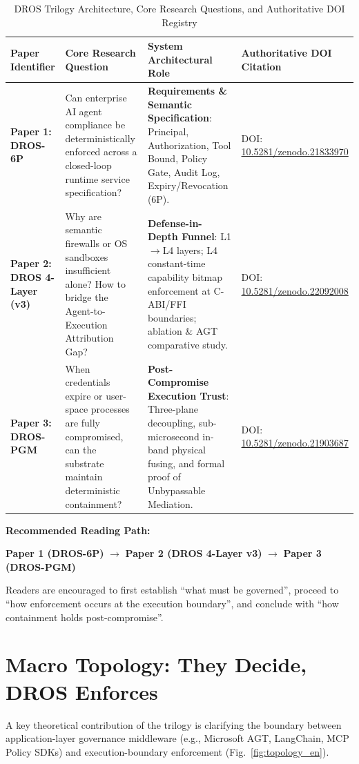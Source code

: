 \documentclass[conference]{IEEEtran}
\begin{document}
\begin{table}[t]
\caption{DROS Trilogy Architecture, Core Research Questions, and Authoritative DOI Registry}
\label{tab:trilogy_overview_en}
\centering
\footnotesize
\renewcommand{\arraystretch}{1.3}
\begin{tabularx}{\textwidth}{l Y Y Y}
\toprule
\textbf{Paper Identifier} & \textbf{Core Research Question} & \textbf{System Architectural Role} & \textbf{Authoritative DOI Citation} \\
\midrule
\textbf{Paper 1: DROS-6P} & Can enterprise AI agent compliance be deterministically enforced across a closed-loop runtime service specification? & \textbf{Requirements \& Semantic Specification}: Principal, Authorization, Tool Bound, Policy Gate, Audit Log, Expiry/Revocation (6P). & DOI: \href{https://doi.org/10.5281/zenodo.21833970}{10.5281/zenodo.21833970} \\
\textbf{Paper 2: DROS 4-Layer (v3)} & Why are semantic firewalls or OS sandboxes insufficient alone? How to bridge the Agent-to-Execution Attribution Gap? & \textbf{Defense-in-Depth Funnel}: L1$\rightarrow$L4 layers; L4 constant-time capability bitmap enforcement at C-ABI/FFI boundaries; ablation \& AGT comparative study. & DOI: \href{https://doi.org/10.5281/zenodo.22092008}{10.5281/zenodo.22092008} \\
\textbf{Paper 3: DROS-PGM} & When credentials expire or user-space processes are fully compromised, can the substrate maintain deterministic containment? & \textbf{Post-Compromise Execution Trust}: Three-plane decoupling, sub-microsecond in-band physical fusing, and formal proof of Unbypassable Mediation. & DOI: \href{https://doi.org/10.5281/zenodo.21903687}{10.5281/zenodo.21903687} \\
\bottomrule
\end{tabularx}
\end{table}

\textbf{Recommended Reading Path:}
\begin{center}
\textbf{Paper 1 (DROS-6P)} $\longrightarrow$ \textbf{Paper 2 (DROS 4-Layer v3)} $\longrightarrow$ \textbf{Paper 3 (DROS-PGM)}
\end{center}
Readers are encouraged to first establish ``what must be governed'', proceed to ``how enforcement occurs at the execution boundary'', and conclude with ``how containment holds post-compromise''.

\section{Macro Topology: They Decide, DROS Enforces}
A key theoretical contribution of the trilogy is clarifying the boundary between application-layer governance middleware (e.g., Microsoft AGT, LangChain, MCP Policy SDKs) and execution-boundary enforcement (Fig.~\ref{fig:topology_en}).
\end{document}
